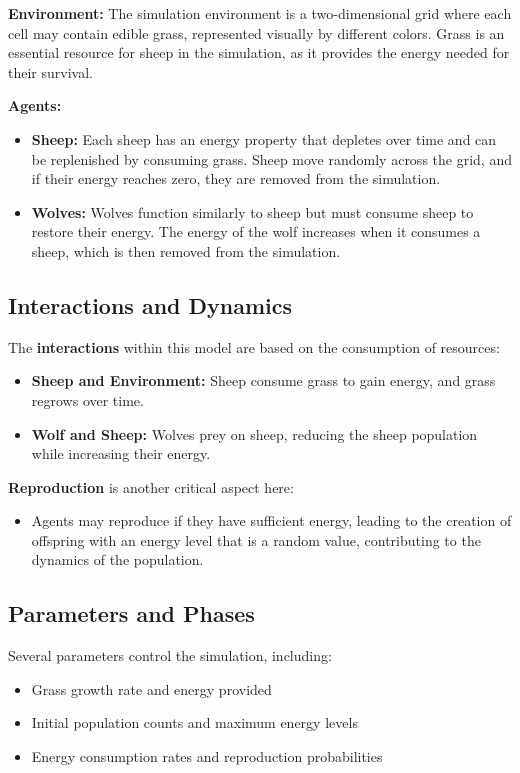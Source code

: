\documentclass[12pt,a4paper]{article}
\begin{document}
\textbf{Environment:} The simulation environment is a two-dimensional grid where each cell may contain edible grass, represented visually by different colors. Grass is an essential resource for sheep in the simulation, as it provides the energy needed for their survival.

\vspace{2mm}
\textbf{Agents:}
\begin{itemize}
    \item \textbf{Sheep:} Each sheep has an energy property that depletes over time and can be replenished by consuming grass. Sheep move randomly across the grid, and if their energy reaches zero, they are removed from the simulation.
    \item \textbf{Wolves:} Wolves function similarly to sheep but must consume sheep to restore their energy. The energy of the wolf increases when it consumes a sheep, which is then removed from the simulation.
\end{itemize}

\subsection{Interactions and Dynamics}

The \textbf{interactions} within this model are based on the consumption of resources:
\begin{itemize}
    \item \textbf{Sheep and Environment:} Sheep consume grass to gain energy, and grass regrows over time.
    \item \textbf{Wolf and Sheep:} Wolves prey on sheep, reducing the sheep population while increasing their energy.
\end{itemize}

\textbf{Reproduction} is another critical aspect here:
\begin{itemize}
    \item Agents may reproduce if they have sufficient energy, leading to the creation of offspring with an energy level that is a random value, contributing to the dynamics of the population.
\end{itemize}

\subsection{Parameters and Phases}

Several parameters control the simulation, including:
\begin{itemize}
    \item Grass growth rate and energy provided
    \item Initial population counts and maximum energy levels
    \item Energy consumption rates and reproduction probabilities
\end{itemize}
\end{document}
